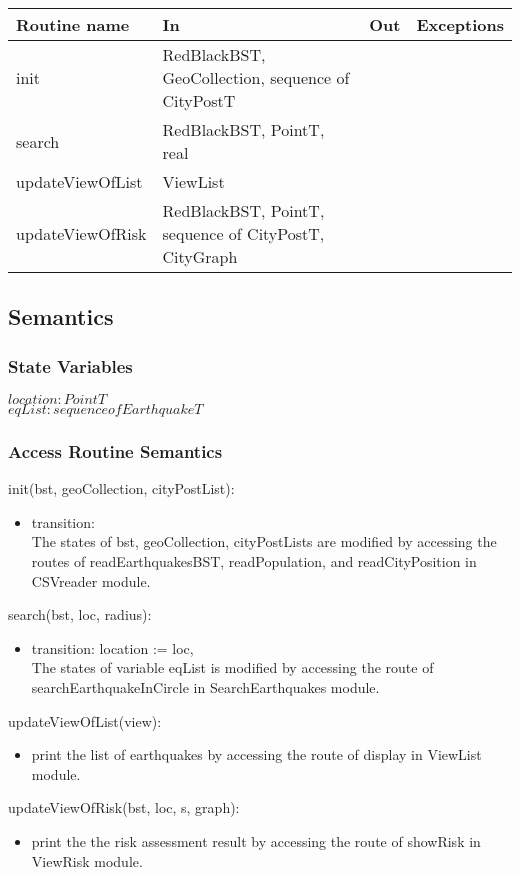 \documentclass[12pt]{article}
\begin{document}
\begin{tabular}{| l | l | l | p{2.3cm} |}
\hline
\textbf{Routine name} & \textbf{In} & \textbf{Out} & \textbf{Exceptions}\\
\hline
init & RedBlackBST, GeoCollection, sequence of CityPostT &  &  ~\\
\hline
search & RedBlackBST, PointT, real &  &  ~\\
\hline
updateViewOfList & ViewList &  &  ~\\
\hline
updateViewOfRisk & RedBlackBST, PointT, sequence of CityPostT, CityGraph &  &  ~\\
\hline
\end{tabular}

\subsection* {Semantics}

\subsubsection* {State Variables}
$\mathit{location} : PointT$ \\
$\mathit{eqList} : sequence of EarthquakeT$ \\

\subsubsection* {Access Routine Semantics}

\noindent init(bst, geoCollection, cityPostList):
\begin{itemize}
\item transition: \\
The states of bst, geoCollection, cityPostLists are modified by accessing the routes of readEarthquakesBST, readPopulation, and readCityPosition  in CSVreader module.
\end{itemize}

\noindent search(bst, loc, radius):
\begin{itemize}
\item transition: location := loc,\\
The states of variable eqList is modified by accessing the route of searchEarthquakeInCircle in SearchEarthquakes module.
\end{itemize}


\noindent updateViewOfList(view):
\begin{itemize}
\item print the list of earthquakes by accessing the route of display in ViewList module.
\end{itemize}

\noindent updateViewOfRisk(bst, loc, s, graph):
\begin{itemize}
\item print the the risk assessment result by accessing the route of showRisk in ViewRisk module.
\end{itemize}
\end{document}
